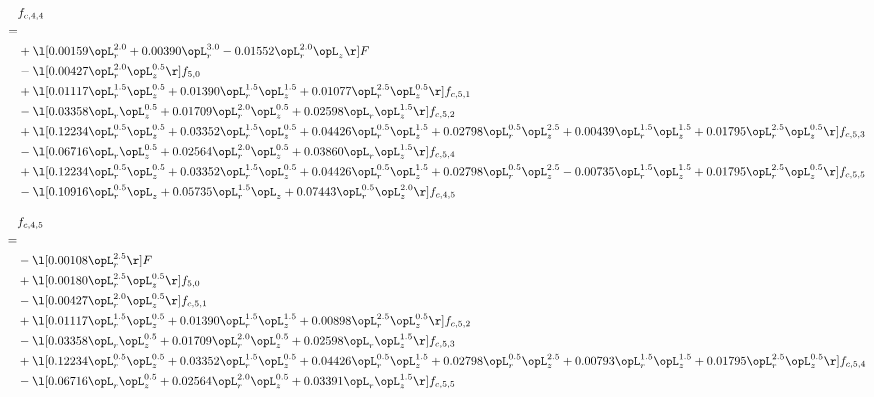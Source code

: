 \begin{alignat}{2} 
\label{eq:f_44_2} 
& f_{c,4,4} \nonumber \\ 
 = \\ 
& + \l[  0.00159 \opL_r^{2.0} +  0.00390 \opL_r^{3.0}   -0.01552 \opL_r^{2.0} \opL_z  \r] F \nonumber \\ 
& - \l[  0.00427 \opL_r^{2.0} \opL_z^{0.5}  \r] f_{5,0} \nonumber \\ 
& + \l[  0.01117 \opL_r^{1.5} \opL_z^{0.5} +  0.01390 \opL_r^{1.5} \opL_z^{1.5} +  0.01077 \opL_r^{2.5} \opL_z^{0.5}  \r] f_{c,5,1} \nonumber \\ 
& - \l[  0.03358 \opL_r \opL_z^{0.5} +  0.01709 \opL_r^{2.0} \opL_z^{0.5} +  0.02598 \opL_r \opL_z^{1.5}  \r] f_{c,5,2} \nonumber \\ 
& + \l[  0.12234 \opL_r^{0.5} \opL_z^{0.5} +  0.03352 \opL_r^{1.5} \opL_z^{0.5} +  0.04426 \opL_r^{0.5} \opL_z^{1.5} +  0.02798 \opL_r^{0.5} \opL_z^{2.5} +  0.00439 \opL_r^{1.5} \opL_z^{1.5} +  0.01795 \opL_r^{2.5} \opL_z^{0.5}  \r] f_{c,5,3} \nonumber \\ 
& - \l[  0.06716 \opL_r \opL_z^{0.5} +  0.02564 \opL_r^{2.0} \opL_z^{0.5} +  0.03860 \opL_r \opL_z^{1.5}  \r] f_{c,5,4} \nonumber \\ 
& + \l[  0.12234 \opL_r^{0.5} \opL_z^{0.5} +  0.03352 \opL_r^{1.5} \opL_z^{0.5} +  0.04426 \opL_r^{0.5} \opL_z^{1.5} +  0.02798 \opL_r^{0.5} \opL_z^{2.5}   -0.00735 \opL_r^{1.5} \opL_z^{1.5} +  0.01795 \opL_r^{2.5} \opL_z^{0.5}  \r] f_{c,5,5} \nonumber \\ 
& - \l[  0.10916 \opL_r^{0.5} \opL_z +  0.05735 \opL_r^{1.5} \opL_z +  0.07443 \opL_r^{0.5} \opL_z^{2.0}  \r] f_{c,4,5} \nonumber \\ 
\end{alignat} 


\begin{alignat}{2} 
\label{eq:f_45_2} 
& f_{c,4,5} \nonumber \\ 
 = \\ 
& - \l[  0.00108 \opL_r^{2.5}  \r] F \nonumber \\ 
& + \l[  0.00180 \opL_r^{2.5} \opL_z^{0.5}  \r] f_{5,0} \nonumber \\ 
& - \l[  0.00427 \opL_r^{2.0} \opL_z^{0.5}  \r] f_{c,5,1} \nonumber \\ 
& + \l[  0.01117 \opL_r^{1.5} \opL_z^{0.5} +  0.01390 \opL_r^{1.5} \opL_z^{1.5} +  0.00898 \opL_r^{2.5} \opL_z^{0.5}  \r] f_{c,5,2} \nonumber \\ 
& - \l[  0.03358 \opL_r \opL_z^{0.5} +  0.01709 \opL_r^{2.0} \opL_z^{0.5} +  0.02598 \opL_r \opL_z^{1.5}  \r] f_{c,5,3} \nonumber \\ 
& + \l[  0.12234 \opL_r^{0.5} \opL_z^{0.5} +  0.03352 \opL_r^{1.5} \opL_z^{0.5} +  0.04426 \opL_r^{0.5} \opL_z^{1.5} +  0.02798 \opL_r^{0.5} \opL_z^{2.5} +  0.00793 \opL_r^{1.5} \opL_z^{1.5} +  0.01795 \opL_r^{2.5} \opL_z^{0.5}  \r] f_{c,5,4} \nonumber \\ 
& - \l[  0.06716 \opL_r \opL_z^{0.5} +  0.02564 \opL_r^{2.0} \opL_z^{0.5} +  0.03391 \opL_r \opL_z^{1.5}  \r] f_{c,5,5} \nonumber \\ 
\end{alignat} 


